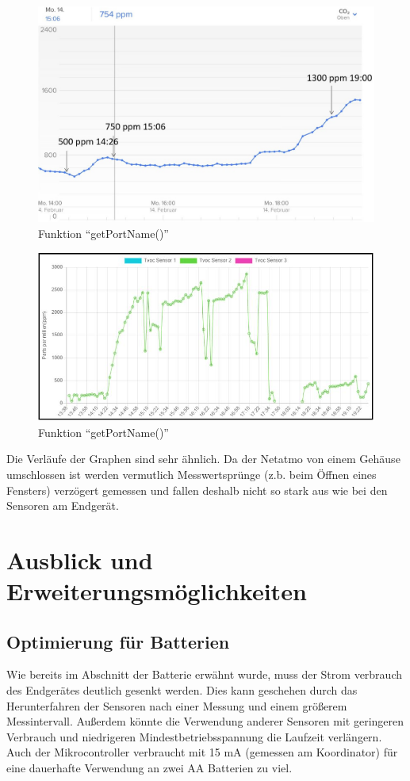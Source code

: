\documentclass[]{article}
\begin{document}
			\begin{figure}[!h]
				\centering
				\includegraphics[scale=0.18]{images/CO2_NETATMO}
				\caption{Funktion “getPortName()”}
				\label{img:CO2_NETATMO}
			\end{figure}
			\begin{figure}[!h]
				\includegraphics[scale=0.18]{images/TVOC_proj}
				\caption{Funktion “getPortName()”}
				\label{img:TVOC_proj}
			\end{figure}

		
		
			Die Verläufe der Graphen sind sehr ähnlich. Da der Netatmo von einem Gehäuse umschlossen ist werden vermutlich Messwertsprünge (z.b. beim Öffnen eines Fensters) verzögert gemessen und fallen deshalb nicht so stark aus wie bei den Sensoren am Endgerät.
			\clearpage
	\section{Ausblick und Erweiterungsmöglichkeiten}
		\subsection{Optimierung für Batterien}
			Wie bereits im Abschnitt der Batterie erwähnt wurde, muss der Strom verbrauch des Endgerätes deutlich gesenkt werden.
			Dies kann geschehen durch das Herunterfahren der Sensoren nach einer Messung und einem größerem Messintervall. Außerdem könnte die Verwendung anderer Sensoren mit geringeren Verbrauch und niedrigeren Mindestbetriebsspannung die Laufzeit verlängern. Auch der Mikrocontroller verbraucht mit 15 mA (gemessen am Koordinator) für eine dauerhafte Verwendung an zwei AA Batterien zu viel.
		
\end{document}
